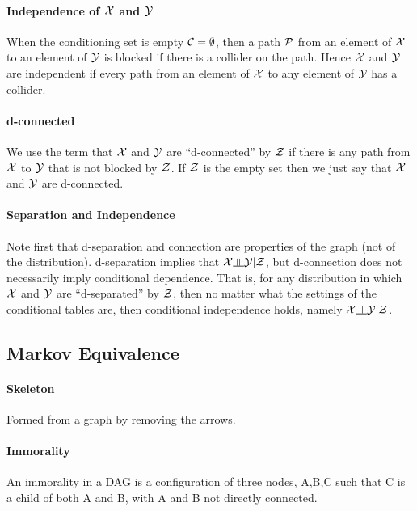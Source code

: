 \paragraph{Independence of $\mathcal{X}$ and $\mathcal{Y}$}

When the conditioning set is empty $\mathcal{C}=\emptyset$, then a path $\mathcal{P}$ from an element of $\mathcal{X}$ to an element of $\mathcal{Y}$ is blocked if there is a collider on the path. Hence $\mathcal{X}$ and $\mathcal{Y}$ are independent if every path from an element of $\mathcal{X}$ to any element of $\mathcal{Y}$ has a collider.

\paragraph{d-connected}

We use the term that $\mathcal{X}$ and $\mathcal{Y}$ are ``d-connected'' by $\mathcal{Z}$ if there is any path from $\mathcal{X}$ to $\mathcal{Y}$ that is not blocked by $\mathcal{Z}$. If $\mathcal{Z}$ is the empty set then we just say that $\mathcal{X}$ and $\mathcal{Y}$ are d-connected.

\paragraph{Separation and Independence}

Note first that d-separation and connection are properties of the graph (not of the distribution). d-separation implies that $\cX\indep \cY|\cZ$, but d-connection does not necessarily imply conditional dependence. That is, for any distribution in which $\mathcal{X}$ and $\mathcal{Y}$ are ``d-separated'' by $\mathcal{Z}$, then no matter what the settings of the conditional tables are, then conditional independence holds, namely $\cX\indep \cY|\cZ$.

\subsection{Markov Equivalence}

\paragraph{Skeleton}

Formed from a graph by removing the arrows.

\paragraph{Immorality}

An immorality in a DAG is a configuration of three nodes, A,B,C such that C is a child of both A and B, with A and B not directly connected.

